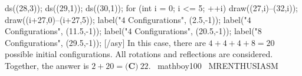 \documentclass[12pt]{article}
\begin{document}
ds((28,3)); ds((29,1)); ds((30,1)); for (int i = 0; i <= 5; ++i) { draw((27,i)--(32,i)); draw((i+27,0)--(i+27,5)); } label("$4$ Configurations", (2.5,-1)); label("$4$ Configurations", (11.5,-1)); label("$4$ Configurations", (20.5,-1)); label("$8$ Configurations", (29.5,-1)); [/asy] In this case, there are $4+4+4+8=20$ possible initial configurations. All rotations and reflections are considered. Together, the answer is $2+20=\boxed{\textbf{(C)}\ 22}.$ ~mathboy100 ~MRENTHUSIASM
\end{document}
